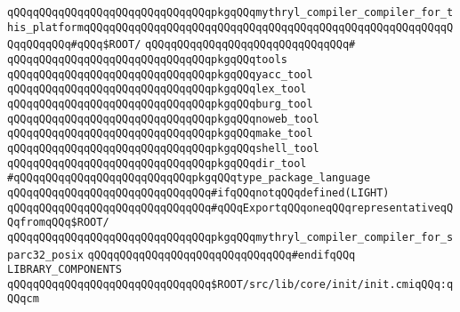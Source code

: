 \verb|qQQqqQQqqQQqqQQqqQQqqQQqqQQqqQQqpkgqQQqmythryl_compiler_compiler_for_this_platformqQQqqQQqqQQqqQQqqQQqqQQqqQQqqQQqqQQqqQQqqQQqqQQqqQQqqQQqqQQqqQQqqQQq#qQQq$ROOT/|\newline
\verb|qQQqqQQqqQQqqQQqqQQqqQQqqQQqqQQq#|\newline
\verb|qQQqqQQqqQQqqQQqqQQqqQQqqQQqqQQqpkgqQQqtools|\newline
\verb|qQQqqQQqqQQqqQQqqQQqqQQqqQQqqQQqpkgqQQqyacc_tool|\newline
\verb|qQQqqQQqqQQqqQQqqQQqqQQqqQQqqQQqpkgqQQqlex_tool|\newline
\verb|qQQqqQQqqQQqqQQqqQQqqQQqqQQqqQQqpkgqQQqburg_tool|\newline
\verb|qQQqqQQqqQQqqQQqqQQqqQQqqQQqqQQqpkgqQQqnoweb_tool|\newline
\verb|qQQqqQQqqQQqqQQqqQQqqQQqqQQqqQQqpkgqQQqmake_tool|\newline
\verb|qQQqqQQqqQQqqQQqqQQqqQQqqQQqqQQqpkgqQQqshell_tool|\newline
\verb|qQQqqQQqqQQqqQQqqQQqqQQqqQQqqQQqpkgqQQqdir_tool|\newline
\verb|#qQQqqQQqqQQqqQQqqQQqqQQqqQQqpkgqQQqtype_package_language|\newline
\newline
\verb|qQQqqQQqqQQqqQQqqQQqqQQqqQQqqQQq#ifqQQqnotqQQqdefined(LIGHT)|\newline
\verb|qQQqqQQqqQQqqQQqqQQqqQQqqQQqqQQq#qQQqExportqQQqoneqQQqrepresentativeqQQqfromqQQq$ROOT/|\newline
\verb|qQQqqQQqqQQqqQQqqQQqqQQqqQQqqQQqpkgqQQqmythryl_compiler_compiler_for_sparc32_posix|\newline
\verb|qQQqqQQqqQQqqQQqqQQqqQQqqQQqqQQq#endifqQQq|\newline
\newline
\newline
\newline
\verb|LIBRARY_COMPONENTS|\newline
\newline
\verb|qQQqqQQqqQQqqQQqqQQqqQQqqQQqqQQq$ROOT/src/lib/core/init/init.cmiqQQq:qQQqcm|\newline
\newline
